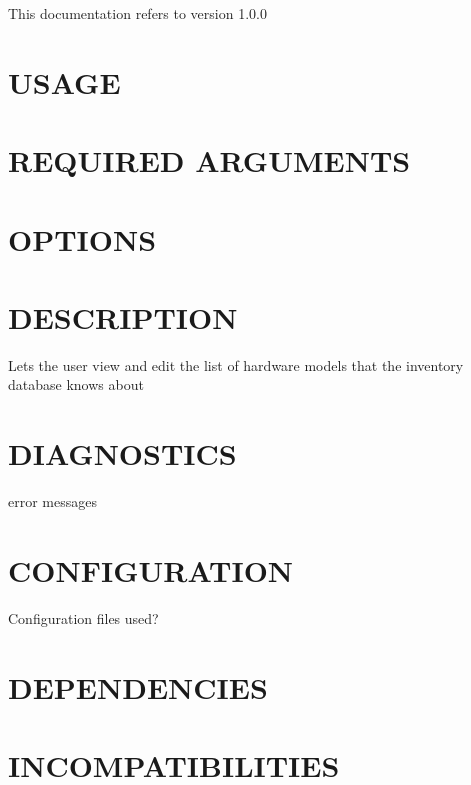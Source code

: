\documentclass{book}
\begin{document}
This documentation refers to version 1.0.0


\section{USAGE}
\label{_USAGE}
\hypertarget{_USAGE}{}


\section{REQUIRED ARGUMENTS}
\label{_REQUIRED_ARGUMENTS}
\hypertarget{_REQUIRED_ARGUMENTS}{}


\section{OPTIONS}
\label{_OPTIONS}
\hypertarget{_OPTIONS}{}


\section{DESCRIPTION}
\label{_DESCRIPTION}
\hypertarget{_DESCRIPTION}{}



Lets the user view and edit the list of hardware models that the inventory database knows about


\section{DIAGNOSTICS}
\label{_DIAGNOSTICS}
\hypertarget{_DIAGNOSTICS}{}



error messages


\section{CONFIGURATION}
\label{_CONFIGURATION}
\hypertarget{_CONFIGURATION}{}



Configuration files used?


\section{DEPENDENCIES}
\label{_DEPENDENCIES}
\hypertarget{_DEPENDENCIES}{}


\section{INCOMPATIBILITIES}
\label{_INCOMPATIBILITIES}
\hypertarget{_INCOMPATIBILITIES}{}
\end{document}
